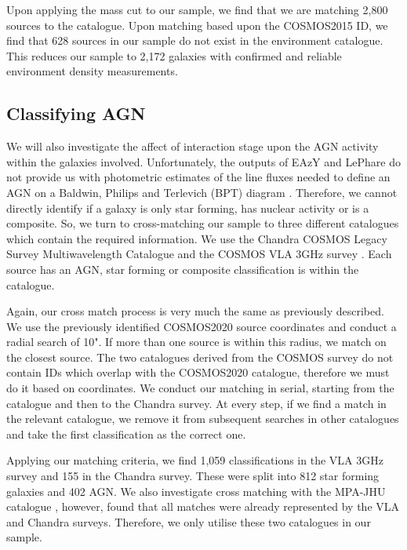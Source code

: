 \documentclass[fleqn,usenatbib]{mnras}
\begin{document}
Upon applying the mass cut to our sample, we find that we are matching 2,800 sources to the \citet{2017ApJ...837...16D} catalogue. Upon matching based upon the COSMOS2015 ID, we find that 628 sources in our sample do not exist in the environment catalogue. This reduces our sample to 2,172 galaxies with confirmed and reliable environment density measurements.

\subsection{Classifying AGN}
\noindent We will also investigate the affect of interaction stage upon the AGN activity within the galaxies involved. Unfortunately, the outputs of EAzY and LePhare do not provide us with photometric estimates of the line fluxes needed to define an AGN on a Baldwin, Philips and Terlevich (BPT) diagram \citep{}. Therefore, we cannot directly identify if a galaxy is only star forming, has nuclear activity or is a composite. So, we turn to cross-matching our sample to three different catalogues which contain the required information. We use the Chandra COSMOS Legacy Survey Multiwavelength Catalogue \citep{2016ApJ...817...34M} and the COSMOS VLA 3GHz survey \citep{2017A&A...602A...6S, 2017A&A...602A...3D}. Each source has an AGN, star forming or composite classification is within the catalogue.


Again, our cross match process is very much the same as previously described. We use the previously identified COSMOS2020 source coordinates and conduct a radial search of 10". If more than one source is within this radius, we match on the closest source. The two catalogues derived from the COSMOS survey do not contain IDs which overlap with the COSMOS2020 catalogue, therefore we must do it based on coordinates. We conduct our matching in serial, starting from the \citet{2017A&A...602A...6S} catalogue and then to the Chandra survey. At every step, if we find a match in the relevant catalogue, we remove it from subsequent searches in other catalogues and take the first classification as the correct one.

Applying our matching criteria, we find 1,059 classifications in the VLA 3GHz survey and 155 in the Chandra survey. These were split into 812 star forming galaxies and 402 AGN. We also investigate cross matching with the MPA-JHU catalogue \citep{2003MNRAS.341...33K, 2004MNRAS.351.1151B, 2007ApJS..173..267S}, however, found that all matches were already represented by the VLA and Chandra surveys. Therefore, we only utilise these two catalogues in our sample.
\end{document}
